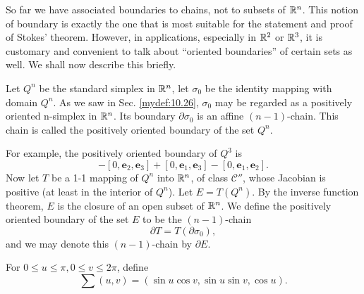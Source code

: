 \begin{mydef}
    \label{mydef:10.31}
    So far we have associated boundaries to chains, not to subsets of ${\protect\mathbb R}^n$. 
    This notion of boundary is exactly the one that is most suitable for the statement and proof of Stokes' theorem.
    However, in applications, especially in ${\protect\mathbb R}^2$ or ${\protect\mathbb R}^3$, it is customary and convenient to talk about ``oriented boundaries'' of certain sets as well. 
    We shall now describe this briefly. 
    
    Let $Q^n$ be the standard simplex in ${\protect\mathbb R}^n$, 
    let $\sigma_0$ be the identity mapping with domain $Q^n$. 
    As we saw in Sec. \ref{mydef:10.26}, $\sigma_0$ may be regarded as a positively oriented n-simplex in ${\protect\mathbb R}^n$. 
    Its boundary $\partial\sigma_0$ is an affine $(n - 1)$-chain. 
    This chain is called the positively oriented boundary of the set $Q^n$. 
    
    For example, the positively oriented boundary of $Q^3$ is
    \begin{equation*}
        [\mathbf{e}_1, \mathbf{e}_2, \mathbf{e}_3] -
        [           0, \mathbf{e}_2, \mathbf{e}_3] +
        [           0, \mathbf{e}_1, \mathbf{e}_3] -
        [           0, \mathbf{e}_1, \mathbf{e}_2] .
    \end{equation*}
    Now let $T$ be a 1-1 mapping of $Q^n$ into ${\protect\mathbb R}^n$, of class $\mathscr{C}''$, 
    whose Jacobian is positive 
    (at least in the interior of $Q^n$). 
    Let $E = T(Q^n)$. 
    By the inverse function theorem, $E$ is the closure of an open subset of ${\protect\mathbb R}^n$. 
    We define the positively oriented boundary of the set $E$ to be the $(n - 1)$-chain
    \begin{equation*}
        \partial T = T (\partial \sigma_0) ,
    \end{equation*}
    and we may denote this $(n - 1)$-chain by $\partial E$.
\end{mydef}

\begin{newexample}
    \label{newexample:10.32}
    For $0 \leq u \leq \pi, 0 \leq v \leq 2\pi$, define
    \begin{equation*}
        \sum(u,v) = \left( 
            \sin u \cos v,
            \sin u \sin v,
            \cos u
         \right).
    \end{equation*}
\end{newexample}
